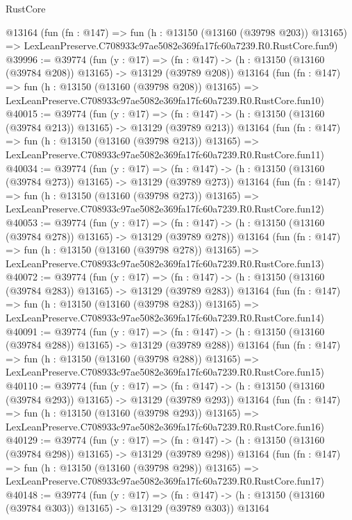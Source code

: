 \begin{lexlean}{RustCore}
\begin{coremodule}
    @13164
    (fun (fn : @147) =>
    fun (h : @13150 (@13160 (@39798 @203)) @13165) =>
    LexLeanPreserve.C708933c97ae5082e369fa17fc60a7239.R0.RustCore.fun9)
@39996 := @39774
    (fun (y : @17) =>
    (fn : @147) -> (h : @13150 (@13160 (@39784 @208)) @13165) -> @13129 (@39789 @208))
    @13164
    (fun (fn : @147) =>
    fun (h : @13150 (@13160 (@39798 @208)) @13165) =>
    LexLeanPreserve.C708933c97ae5082e369fa17fc60a7239.R0.RustCore.fun10)
@40015 := @39774
    (fun (y : @17) =>
    (fn : @147) -> (h : @13150 (@13160 (@39784 @213)) @13165) -> @13129 (@39789 @213))
    @13164
    (fun (fn : @147) =>
    fun (h : @13150 (@13160 (@39798 @213)) @13165) =>
    LexLeanPreserve.C708933c97ae5082e369fa17fc60a7239.R0.RustCore.fun11)
@40034 := @39774
    (fun (y : @17) =>
    (fn : @147) -> (h : @13150 (@13160 (@39784 @273)) @13165) -> @13129 (@39789 @273))
    @13164
    (fun (fn : @147) =>
    fun (h : @13150 (@13160 (@39798 @273)) @13165) =>
    LexLeanPreserve.C708933c97ae5082e369fa17fc60a7239.R0.RustCore.fun12)
@40053 := @39774
    (fun (y : @17) =>
    (fn : @147) -> (h : @13150 (@13160 (@39784 @278)) @13165) -> @13129 (@39789 @278))
    @13164
    (fun (fn : @147) =>
    fun (h : @13150 (@13160 (@39798 @278)) @13165) =>
    LexLeanPreserve.C708933c97ae5082e369fa17fc60a7239.R0.RustCore.fun13)
@40072 := @39774
    (fun (y : @17) =>
    (fn : @147) -> (h : @13150 (@13160 (@39784 @283)) @13165) -> @13129 (@39789 @283))
    @13164
    (fun (fn : @147) =>
    fun (h : @13150 (@13160 (@39798 @283)) @13165) =>
    LexLeanPreserve.C708933c97ae5082e369fa17fc60a7239.R0.RustCore.fun14)
@40091 := @39774
    (fun (y : @17) =>
    (fn : @147) -> (h : @13150 (@13160 (@39784 @288)) @13165) -> @13129 (@39789 @288))
    @13164
    (fun (fn : @147) =>
    fun (h : @13150 (@13160 (@39798 @288)) @13165) =>
    LexLeanPreserve.C708933c97ae5082e369fa17fc60a7239.R0.RustCore.fun15)
@40110 := @39774
    (fun (y : @17) =>
    (fn : @147) -> (h : @13150 (@13160 (@39784 @293)) @13165) -> @13129 (@39789 @293))
    @13164
    (fun (fn : @147) =>
    fun (h : @13150 (@13160 (@39798 @293)) @13165) =>
    LexLeanPreserve.C708933c97ae5082e369fa17fc60a7239.R0.RustCore.fun16)
@40129 := @39774
    (fun (y : @17) =>
    (fn : @147) -> (h : @13150 (@13160 (@39784 @298)) @13165) -> @13129 (@39789 @298))
    @13164
    (fun (fn : @147) =>
    fun (h : @13150 (@13160 (@39798 @298)) @13165) =>
    LexLeanPreserve.C708933c97ae5082e369fa17fc60a7239.R0.RustCore.fun17)
@40148 := @39774
    (fun (y : @17) =>
    (fn : @147) -> (h : @13150 (@13160 (@39784 @303)) @13165) -> @13129 (@39789 @303))
    @13164

\end{coremodule}
\end{lexlean}
